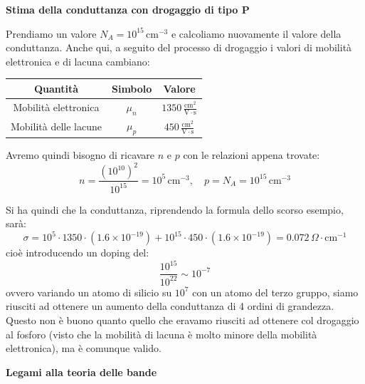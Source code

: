 \documentclass[a4paper,11pt]{article}
\begin{document}
\par\smallskip

\noindent
\textbf{\textsf{Stima della conduttanza con drogaggio di tipo P}}

\noindent
Prendiamo un valore $N_A = 10^{15} \, \mathrm{cm}^{-3}$ e calcoliamo nuovamente il valore della conduttanza. Anche qui, a seguito del processo di drogaggio i valori di mobilità elettronica e di lacuna cambiano:
\begin{table}[H]
	\center {}
	\begin{tabular} { c | c | c  }
		\bfseries Quantità & \bfseries Simbolo & \bfseries Valore \\
		\hline 
		Mobilità elettronica & $\mu_n$ & $1350  \, \frac{\mathrm{cm}^2}{\mathrm{V} \cdot \mathrm{s}}$ \\
		Mobilità delle lacune & $\mu_p$ & $450  \, \frac{\mathrm{cm}^2}{\mathrm{V} \cdot \mathrm{s}}$
	\end{tabular}
\end{table}

Avremo quindi bisogno di ricavare $n$ e $p$ con le relazioni appena trovate:
$$
n = \frac{(10^{10})^2}{10^{15}} = 10^5 \, \mathrm{cm}^{-3}, \quad p = N_A = 10^{15} \, \mathrm{cm}^{-3}
$$

Si ha quindi che la conduttanza, riprendendo la formula dello scorso esempio, sarà:
$$
\sigma = 10^{5} \cdot 1350 \cdot (1.6 \times 10^{-19}) + 10^{15} \cdot 450 \cdot (1.6 \times 10^{-19}) = 0.072 \, \Omega \cdot \mathrm{cm}^{-1}
$$
cioè introducendo un doping del:
$$
\frac{10^{15}}{10^{22}} \sim 10^{-7}
$$
ovvero variando un atomo di silicio su $10^{7}$ con un atomo del terzo gruppo, siamo riusciti ad ottenere un aumento della conduttanza di 4 ordini di grandezza. Questo non è buono quanto quello che eravamo riusciti ad ottenere col drogaggio al fosforo (visto che la mobilità di lacuna è molto minore della mobilità elettronica), ma è comunque valido.

\par\smallskip

\noindent
\textbf{\textsf{Legami alla teoria delle bande}}
\end{document}
